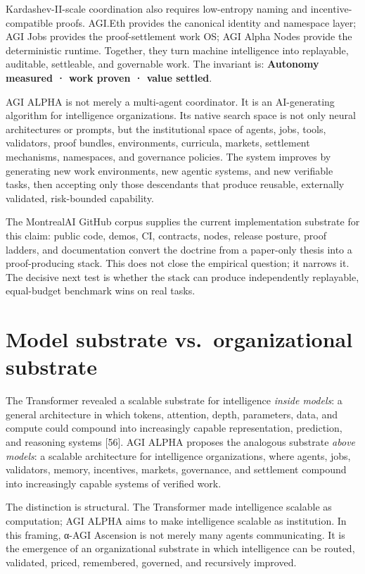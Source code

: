 \documentclass[
  11pt,
]{article}
\begin{document}
Kardashev-II-scale coordination also requires low-entropy naming and
incentive-compatible proofs. AGI.Eth provides the canonical identity and
namespace layer; AGI Jobs provides the proof-settlement work OS; AGI
Alpha Nodes provide the deterministic runtime. Together, they turn
machine intelligence into replayable, auditable, settleable, and
governable work. The invariant is: \textbf{Autonomy measured · work
proven · value settled}.

AGI ALPHA is not merely a multi-agent coordinator. It is an
AI-generating algorithm for intelligence organizations. Its native
search space is not only neural architectures or prompts, but the
institutional space of agents, jobs, tools, validators, proof bundles,
environments, curricula, markets, settlement mechanisms, namespaces, and
governance policies. The system improves by generating new work
environments, new agentic systems, and new verifiable tasks, then
accepting only those descendants that produce reusable, externally
validated, risk-bounded capability.

The MontrealAI GitHub corpus supplies the current implementation
substrate for this claim: public code, demos, CI, contracts, nodes,
release posture, proof ladders, and documentation convert the doctrine
from a paper-only thesis into a proof-producing stack. This does not
close the empirical question; it narrows it. The decisive next test is
whether the stack can produce independently replayable, equal-budget
benchmark wins on real tasks.

\section{Model substrate vs.~organizational
substrate}\label{model-substrate-vs.-organizational-substrate}

The Transformer revealed a scalable substrate for intelligence
\emph{inside models}: a general architecture in which tokens, attention,
depth, parameters, data, and compute could compound into increasingly
capable representation, prediction, and reasoning systems {[}56{]}. AGI
ALPHA proposes the analogous substrate \emph{above models}: a scalable
architecture for intelligence organizations, where agents, jobs,
validators, memory, incentives, markets, governance, and settlement
compound into increasingly capable systems of verified work.

The distinction is structural. The Transformer made intelligence
scalable as computation; AGI ALPHA aims to make intelligence scalable as
institution. In this framing, α-AGI Ascension is not merely many agents
communicating. It is the emergence of an organizational substrate in
which intelligence can be routed, validated, priced, remembered,
governed, and recursively improved.
\end{document}
